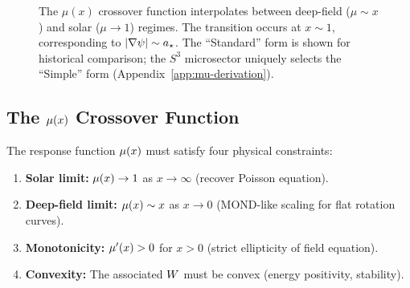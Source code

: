 \begin{figure}[t]
\centering
{}
\caption{The $\mu(x)$ crossover function interpolates between deep-field 
($\mu \sim x$) and solar ($\mu \to 1$) regimes. The transition occurs 
at $x \sim 1$, corresponding to $|\nabla\psi| \sim a_\star$. The ``Standard'' form is shown for historical comparison; the $S^3$ microsector uniquely selects the ``Simple'' form (Appendix~\ref{app:mu-derivation}).}
\label{fig:regimes}
\end{figure}

\subsection{The $\mu(x)$ Crossover Function}\label{sec:mu_function}

The response function $\mu(x)$ must satisfy four physical constraints:

\begin{enumerate}
\item \textbf{Solar limit:} $\mu(x) \to 1$ as $x \to \infty$ 
(recover Poisson equation).
\item \textbf{Deep-field limit:} $\mu(x) \sim x$ as $x \to 0$ 
(MOND-like scaling for flat rotation curves).
\item \textbf{Monotonicity:} $\mu'(x) > 0$ for $x > 0$ 
(strict ellipticity of field equation).
\item \textbf{Convexity:} The associated $W$ must be convex 
(energy positivity, stability).
\end{enumerate}

